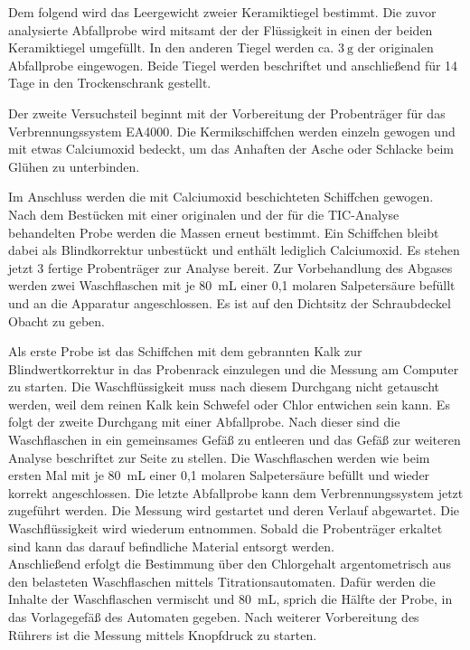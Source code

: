 Dem folgend wird das Leergewicht zweier Keramiktiegel bestimmt.
Die zuvor analysierte Abfallprobe wird mitsamt der der Flüssigkeit in einen der beiden Keramiktiegel umgefüllt.  
In den anderen Tiegel werden ca. $\SI{3}{\gram}$ der originalen Abfallprobe eingewogen. Beide Tiegel werden beschriftet und anschließend für 14 Tage in den Trockenschrank gestellt.
\newpage

Der zweite Versuchsteil beginnt mit der Vorbereitung der Probenträger für das Verbrennungssystem EA4000. Die Kermikschiffchen werden einzeln gewogen und mit etwas Calciumoxid bedeckt, um das Anhaften der Asche oder Schlacke beim Glühen zu unterbinden. 

Im Anschluss werden die mit Calciumoxid beschichteten Schiffchen gewogen. Nach dem Bestücken mit einer originalen und der für die TIC-Analyse behandelten Probe werden die Massen erneut bestimmt.
Ein Schiffchen bleibt dabei als Blindkorrektur unbestückt und enthält lediglich Calciumoxid. 
Es stehen jetzt 3 fertige Probenträger zur Analyse bereit.
Zur Vorbehandlung des Abgases werden zwei Waschflaschen mit je \SI{80}{\milli\liter} einer 0,1 molaren Salpetersäure befüllt und an die Apparatur angeschlossen. Es ist auf den Dichtsitz der Schraubdeckel Obacht zu geben.

Als erste Probe ist das Schiffchen mit dem gebrannten Kalk zur Blindwertkorrektur in das Probenrack einzulegen und die Messung am Computer zu starten.
Die Waschflüssigkeit muss nach diesem Durchgang nicht getauscht werden, weil dem reinen Kalk kein Schwefel oder Chlor entwichen sein kann. 
Es folgt der zweite Durchgang mit einer Abfallprobe. Nach dieser sind die Waschflaschen in ein gemeinsames Gefäß zu entleeren und das Gefäß zur weiteren Analyse beschriftet zur Seite zu stellen. Die Waschflaschen werden wie beim ersten Mal mit je \SI{80}{\milli\liter} einer 0,1 molaren Salpetersäure befüllt und wieder korrekt angeschlossen.
Die letzte Abfallprobe kann dem Verbrennungssystem jetzt zugeführt werden. Die Messung wird gestartet und deren Verlauf abgewartet. Die Waschflüssigkeit wird wiederum entnommen.
Sobald die Probenträger erkaltet sind kann das darauf befindliche Material entsorgt werden.\\
Anschließend erfolgt die Bestimmung über den Chlorgehalt argentometrisch aus den belasteten Waschflaschen mittels Titrationsautomaten. Dafür werden die Inhalte der Waschflaschen vermischt und \SI{80}{\milli \liter}, sprich die Hälfte der Probe, in das Vorlagegefäß des Automaten gegeben. Nach weiterer Vorbereitung des Rührers ist die Messung mittels Knopfdruck zu starten.